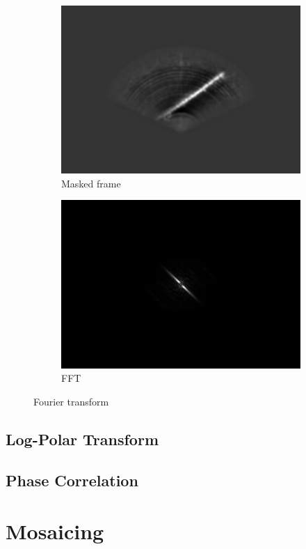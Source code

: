 \begin{figure}[H]
    \centering
    \begin{subfigure}[b]{.45\textwidth}
        \centering
        \includegraphics[width=\textwidth]{figures/pipeline/Masking.png}
        \caption{Masked frame}
    \end{subfigure}
    \hfill
    \begin{subfigure}[b]{.45\textwidth}
        \centering
        \includegraphics[width=\textwidth]{figures/pipeline/FFT.png}
        \caption{FFT}
    \end{subfigure}
    \caption{Fourier transform}
    \label{fig:fft}
\end{figure}


\subsection{Log-Polar Transform}

\subsection{Phase Correlation}

\section{Mosaicing}